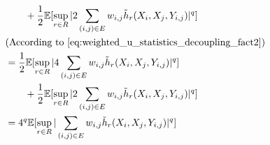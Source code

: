 \documentclass[letterpaper]{article} %
\def\DoubleColumnEnd{}
\def\SingleColumn{}
\newcommand{\E}{\mathbb{E}}
\newcommand{\pair}[1]{(#1)}
\begin{document}
\begin{align*}
        &\qquad+ \frac{1}{2}\E[\sup_{r\in R} |2\sum_{\pair{i,j}\in E}w_{i,j}\tilde{h}_r(X_i,X_j,Y_{i,j})|^q]\\
        &(\text{According to }\eqref{eq:weighted_u_statistics_decoupling_fact2})\\
        &= \frac{1}{2}\E[\sup_{r\in R} |4\sum_{\pair{i,j}\in E}w_{i,j}\tilde{h}_r(X_i,X_j,Y_{i,j})|^q] \\
        &\qquad+ \frac{1}{2}\E[\sup_{r\in R} |2\sum_{\pair{i,j}\in E}w_{i,j}\tilde{h}_r(X_i,X_j,Y_{i,j})|^q]\\
        &= 4^q\E[\sup_{r\in R} |\sum_{\pair{i,j}\in E}w_{i,j}\tilde{h}_r(X_i,X_j,Y_{i,j})|^q]
    \end{align*}
    \DoubleColumnEnd
    \SingleColumn
\end{document}
